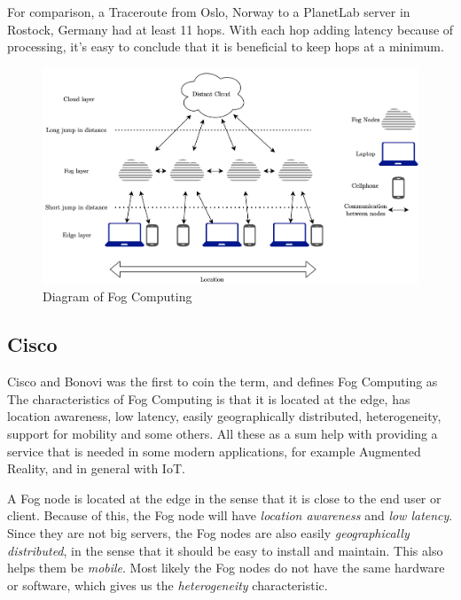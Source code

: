 For comparison, a Traceroute\cite{noauthor_traceroute68_nodate} from Oslo, Norway to a PlanetLab server in Rostock, Germany had at least 11 hops. With each hop adding latency because of processing, it’s easy to conclude that it is beneficial to keep hops at a minimum.

\begin{figure}[t]
    \centering
    \includegraphics[scale=0.6]{chapters/background/figures/Fog.png}
    \caption{Diagram of Fog Computing}
    \label{fig:FogDiagram}
\end{figure}

\subsection{Cisco}
Cisco\cite{bonomi_fog_nodate} and Bonovi was the first to coin the term, and defines Fog Computing as   The characteristics of Fog Computing is that it is located at the edge, has location awareness, low latency, easily geographically distributed, heterogeneity, support for mobility and some others. All these as a sum help with providing a service that is needed in some modern applications, for example Augmented Reality, and in general with IoT.

A Fog node is located at the edge in the sense that it is close to the end user or client. Because of this, the Fog node will have \textit{location awareness} and \textit{low latency}. Since they are not big servers, the Fog nodes are also easily \textit{geographically distributed}, in the sense that it should be easy to install and maintain. This also helps them be \textit{mobile}. Most likely the Fog nodes do not have the same hardware or software, which gives us the \textit{heterogeneity} characteristic. 

